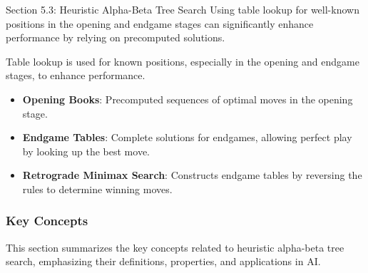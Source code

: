 \begin{notes}{Section 5.3: Heuristic Alpha-Beta Tree Search}
    Using table lookup for well-known positions in the opening and endgame stages can significantly enhance performance by relying on precomputed solutions.
    
    \begin{highlight}
        Table lookup is used for known positions, especially in the opening and endgame stages, to enhance performance.
        
        \begin{itemize}
            \item \textbf{Opening Books}: Precomputed sequences of optimal moves in the opening stage.
            \item \textbf{Endgame Tables}: Complete solutions for endgames, allowing perfect play by looking up the best move.
            \item \textbf{Retrograde Minimax Search}: Constructs endgame tables by reversing the rules to determine winning moves.
        \end{itemize}
    \end{highlight}
    
    \subsubsection*{Key Concepts}
    
    \begin{highlight}
        This section summarizes the key concepts related to heuristic alpha-beta tree search, emphasizing their definitions, properties, and applications in AI.
        

\end{highlight}
\end{notes}
